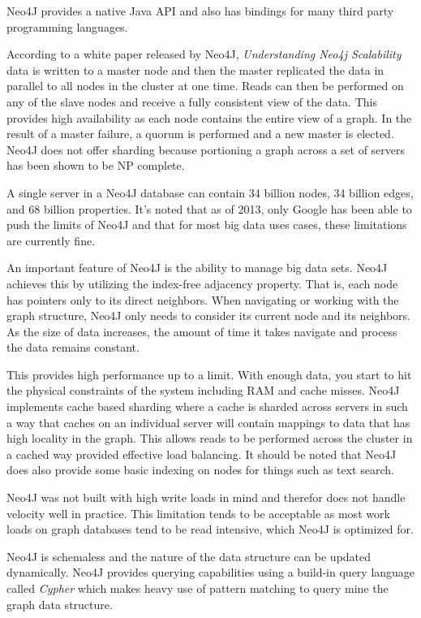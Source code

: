 \documentclass[]{article}
\begin{document}
Neo4J provides a native Java API and also has bindings for many third party programming languages.

According to a white paper released by Neo4J, \textit{Understanding Neo4j Scalability}\cite{montag2013understanding} data is written to a master node and then the master replicated the data in parallel to all nodes in the cluster at one time. Reads can then be performed on any of the slave nodes and receive a fully consistent view of the data. This provides high availability as each node contains the entire view of a graph. In the result of a master failure, a quorum is performed and a new master is elected. Neo4J does not offer sharding because portioning a graph across a set of servers has been shown to be NP complete.

A single server in a Neo4J database can contain 34 billion nodes, 34 billion edges, and 68 billion properties. It's noted that as of 2013, only Google has been able to push the limits of Neo4J and that for most big data uses cases, these limitations are currently fine.

An important feature of Neo4J is the ability to manage big data sets. Neo4J achieves this by utilizing the index-free adjacency property. That is, each node has pointers only to its direct neighbors. When navigating or working with the graph structure, Neo4J only needs to consider its current node and its neighbors. As the size of data increases, the amount of time it takes navigate and process the data remains constant. 

This provides high performance up to a limit. With enough data, you start to hit the physical constraints of the system including RAM and cache misses. Neo4J implements cache based sharding where a cache is sharded across servers in such a way that caches on an individual server will contain mappings to data that has high locality in the graph. This allows reads to be performed across the cluster in a cached way provided effective load balancing. It should be noted that Neo4J does also provide some basic indexing on nodes for things such as text search.

Neo4J was not built with high write loads in mind and therefor does not handle velocity well in practice. This limitation tends to be acceptable as most work loads on graph databases tend to be read intensive, which Neo4J is optimized for. 

Neo4J is schemaless and the nature of the data structure can be updated dynamically\cite{sharma_extended_2015}. Neo4J provides querying capabilities using a build-in query language called \textit{Cypher} which makes heavy use of pattern matching to query mine the graph data structure.
\end{document}
